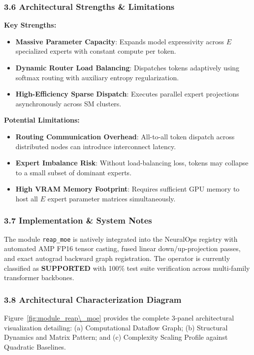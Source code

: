 \subsubsection*{3.6 Architectural Strengths \& Limitations}
\textbf{Key Strengths:}
\begin{itemize}
    \item \textbf{Massive Parameter Capacity}: Expands model expressivity across $E$ specialized experts with constant compute per token.
    \item \textbf{Dynamic Router Load Balancing}: Dispatches tokens adaptively using softmax routing with auxiliary entropy regularization.
    \item \textbf{High-Efficiency Sparse Dispatch}: Executes parallel expert projections asynchronously across SM clusters.
\end{itemize}

\textbf{Potential Limitations:}
\begin{itemize}
    \item \textbf{Routing Communication Overhead}: All-to-all token dispatch across distributed nodes can introduce interconnect latency.
    \item \textbf{Expert Imbalance Risk}: Without load-balancing loss, tokens may collapse to a small subset of dominant experts.
    \item \textbf{High VRAM Memory Footprint}: Requires sufficient GPU memory to host all $E$ expert parameter matrices simultaneously.
\end{itemize}

\subsubsection*{3.7 Implementation \& System Notes}
The module \texttt{reap\_moe} is natively integrated into the NeuralOps registry with automated AMP FP16 tensor casting, fused linear down/up-projection passes, and exact autograd backward graph registration. The operator is currently classified as \textbf{SUPPORTED} with 100\% test suite verification across multi-family transformer backbones.

\subsubsection*{3.8 Architectural Characterization Diagram}
Figure~\ref{fig:module_reap\_moe} provides the complete 3-panel architectural visualization detailing: (a) Computational Dataflow Graph; (b) Structural Dynamics and Matrix Pattern; and (c) Complexity Scaling Profile against Quadratic Baselines.


